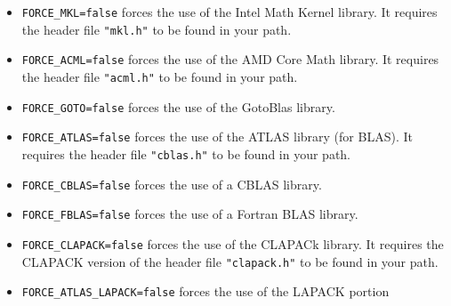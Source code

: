 \begin{enumerate}
\begin{itemize}
Note: the default here used to be \tt{true}.  But my experience has been that the TMV code
is more stable than typical LAPACK distributions, especially with regard to overflow and 
underflow.  And it is generally equally fast, and sometimes faster.  The only exception is 
finding Eigenvectors for extremely large hermitian matrices\footnote{
LAPACK implements an algorithm called Relatively Robust Representation (RRR) to 
find the eigenvectors, rather than the divide and conquer algorithm used by TMV.
RRR is faster, but only when the matrix size is sufficiently large.  Including this algorithm 
in TMV is \#\ref{Bugs_RRR} on my To-do list (\S\ref{Bugs}).
}.  And even then, TMV may still be faster 
if you use a machine with multiple 
cores, since TMV seems to have better parallelization of this algorithm
 (if \tt{WITH_OPENMP=true}) than many LAPACK libraries.
Also, it is worth noting that many LAPACK libraries are not thread safe.
So if your main program uses multiple threads, and you aren't sure whether
your LAPACK library is thread safe, you might want to compile TMV without 
LAPACK to avoid intermittent mysterious segmentation faults from the
LAPACK library.  All the native TMV code is thread safe.
\item \texttt{FORCE\_MKL=false} forces the use of the Intel Math Kernel library. 
It requires the header file \texttt{"mkl.h"} to be found in your path. 
\item \texttt{FORCE\_ACML=false} forces the use of the AMD Core Math library.  
It requires the header file \texttt{"acml.h"} to be found in your path.
\item \texttt{FORCE\_GOTO=false} forces the use of the GotoBlas library.  
\item \texttt{FORCE\_ATLAS=false} forces the use of the ATLAS library (for BLAS).  
It requires the header file \texttt{"cblas.h"} to be found in your path.
\item \texttt{FORCE\_CBLAS=false} forces the use of a CBLAS library.
\item \texttt{FORCE\_FBLAS=false} forces the use of a Fortran BLAS library.
\item \texttt{FORCE\_CLAPACK=false} forces the use of the CLAPACk library. 
It requires the CLAPACK version of the header file \texttt{"clapack.h"} to be found in your path.
\item \texttt{FORCE\_ATLAS\_LAPACK=false} forces the use of the LAPACK portion

\end{itemize}
\end{enumerate}

